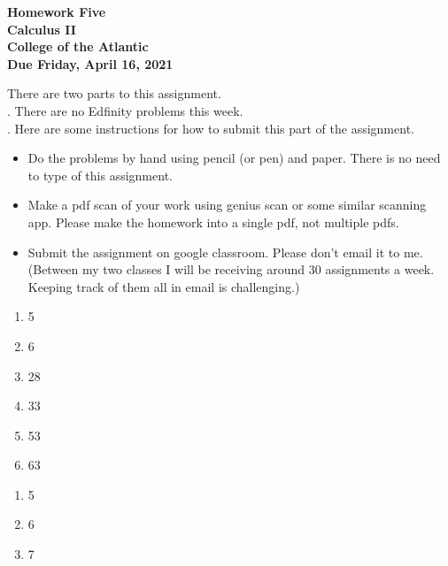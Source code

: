 \documentclass[12pt]{article}
\begin{document}
\pagestyle{empty}
 
\begin{center}
{\LARGE {\bf Homework Five}}\\
\bigskip
{\Large {\bf Calculus II}}\\
\bigskip
{\Large {\bf College of the Atlantic}}\\
\bigskip
{ {\bf Due Friday, April 16, 2021}}\\ 
\end{center}
\medskip


\noindent There are two parts to this assignment.\\

. There are no Edfinity problems
this week.\\

.  Here are some
instructions for how to submit this part of the assignment.
\begin{itemize}
\item Do the problems by hand using pencil (or pen) and paper.
  There is no need to type of this assignment.
\item Make a pdf scan of your work using genius scan or some
  similar scanning app.  Please make the homework into a single
  pdf, not multiple pdfs.
\item Submit the assignment on google classroom.  Please don't
  email it to me.  (Between my two classes I will be receiving
  around 30 assignments a week.  Keeping track of them all in email
  is challenging.)
\end{itemize}


\begin{enumerate}
\setlength{\itemsep}{-1mm}
\item 5
\item 6
\item 28
\item 33
\item 53
\item 63
\end{enumerate}



\begin{enumerate}
\setlength{\itemsep}{-1mm}
\item 5
\item 6
\item 7
\end{enumerate}
\end{document}

